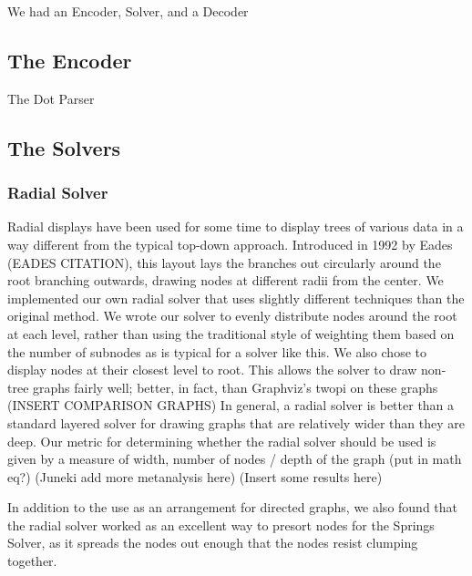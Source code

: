 \documentclass{article}
\begin{document}
We had an Encoder, Solver, and a Decoder

\subsection{The Encoder}
The Dot Parser

\subsection{The Solvers}

\subsubsection{Radial Solver}
Radial displays have been used for some time to display trees of various data in a way different from the typical top-down approach.
Introduced in 1992 by Eades (EADES CITATION), this layout lays the branches out circularly around the root branching outwards, drawing 
nodes at different radii from the center. We implemented our own radial solver that uses slightly different techniques than the original
method. We wrote our solver to evenly distribute nodes around the root at each level, rather than using the traditional style of weighting 
them based on the number of subnodes as is typical for a solver like this. We also chose to display nodes at their closest level to root. 
This allows the solver to draw non-tree graphs fairly well; better, in fact, than Graphviz's twopi on these graphs (INSERT COMPARISON GRAPHS) 
In general, a radial solver is better than a standard layered solver for drawing graphs that are relatively wider than they are deep. Our metric 
for determining whether the radial solver should be used is given by a measure of width, number of nodes / depth of the graph (put in math eq?) (Juneki
add more metanalysis here) (Insert some results here)

In addition to the use as an arrangement for directed graphs, we also found that the radial solver worked as an excellent way to presort nodes for the
Springs Solver, as it spreads the nodes out enough that the nodes resist clumping together.
\end{document}
